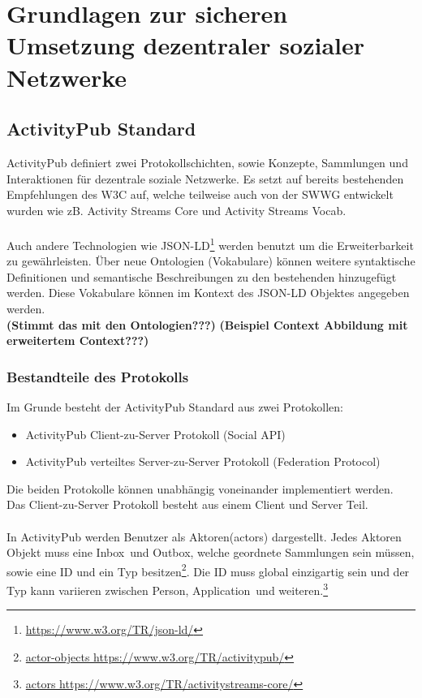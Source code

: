 
\chapter{Grundlagen zur sicheren Umsetzung dezentraler sozialer Netzwerke}
\label{ch:fundamentals}

\section{ActivityPub Standard}
	ActivityPub definiert zwei Protokollschichten, sowie Konzepte, Sammlungen und Interaktionen für dezentrale soziale Netzwerke. Es setzt auf bereits bestehenden Empfehlungen des W3C auf, welche teilweise auch von der SWWG entwickelt wurden wie zB. Activity Streams Core und Activity Streams Vocab. 
	\\\\Auch andere Technologien wie JSON-LD\footnote{\url{https://www.w3.org/TR/json-ld/}} werden benutzt um die Erweiterbarkeit zu gewährleisten. Über neue Ontologien (Vokabulare) können weitere syntaktische Definitionen und semantische Beschreibungen zu den bestehenden hinzugefügt werden. Diese Vokabulare können im Kontext des JSON-LD Objektes angegeben werden.\\ 
	\textbf{(Stimmt das mit den Ontologien???)}
		\textbf{(Beispiel Context Abbildung mit erweitertem Context???)}

\subsection{Bestandteile des Protokolls}
	Im Grunde besteht der ActivityPub Standard aus zwei Protokollen:
	\begin{itemize}
		\item ActivityPub Client-zu-Server Protokoll (Social API)
		\item ActivityPub verteiltes Server-zu-Server Protokoll (Federation Protocol)
	\end{itemize}
	Die beiden Protokolle können unabhängig voneinander implementiert werden. Das Client-zu-Server Protokoll besteht aus einem Client und Server Teil.
	\\\\ In ActivityPub werden Benutzer als \glqq Aktoren\grqq(actors) dargestellt. Jedes Aktoren Objekt muss eine \glqq Inbox\grqq~und \glqq Outbox\grqq, welche geordnete Sammlungen sein müssen, sowie eine ID und ein Typ besitzen\footnote{\href{https://www.w3.org/TR/activitypub/}{actor-objects https://www.w3.org/TR/activitypub/}}. Die ID muss global einzigartig sein und der Typ kann variieren zwischen \glqq Person\grqq, \glqq Application\grqq~und weiteren.\footnote{\href{https://www.w3.org/TR/activitystreams-core/}{actors https://www.w3.org/TR/activitystreams-core/}}
	
